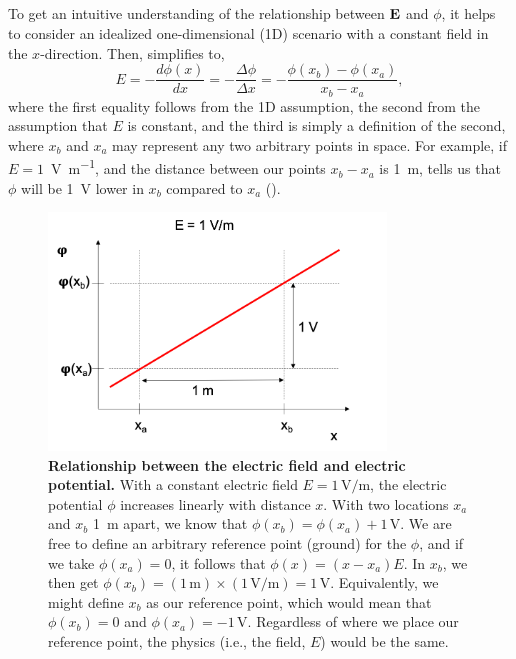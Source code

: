 \subsection{}
\label{sec:Basics:Ground}
To get an intuitive understanding of the relationship between ${\bf E}$ and $\phi$, it helps to consider an idealized one-dimensional (1D) scenario with a constant field in the $x$-direction. Then,  simplifies to,
\begin{equation}
E = -\frac{d\phi(x)}{dx} = -\frac{\Delta \phi}{\Delta x} = -\frac{\phi(x_b)-\phi(x_a)}{x_b-x_a},
\label{eq:Basics:EV1D}
\end{equation}
where the first equality follows from the 1D assumption, the second from the assumption that $E$ is constant, and the third is simply a definition of the second, where $x_b$ and $x_a$ may represent any two arbitrary points in space. For example, if $E = 1$~\si{\volt\per\metre}, and the distance between our points $x_b-x_a$ is 1~\si{\metre},  tells us that $\phi$ will be 1~\si{\volt} lower in $x_b$ compared to $x_a$ ().

\begin{figure}[!ht]
\begin{center}
\includegraphics[width=0.8\textwidth]{Figures/Basics/Ground.png}
\end{center}
\caption{\textbf{Relationship between the electric field and electric potential.} With a constant electric field $E = 1\,\si{\volt\per\metre}$, the electric potential $\phi$ increases linearly with distance $x$. With two locations $x_a$ and $x_b$ 1~\si{\metre} apart, we know that $\phi(x_b) = \phi(x_a) + 1\,\si{\volt}$. We are free to define an arbitrary reference point (ground) for the $\phi$, and if we take $\phi(x_a) = 0$, it follows that $\phi(x) = (x-x_a)E$. In $x_b$, we then get $\phi(x_b)=(1\,\si{\metre})\times(1\, \si{\volt\per\metre}) =1\,\si{\volt}$. Equivalently, we might define $x_b$ as our reference point, which would mean that $\phi(x_b) = 0$ and $\phi(x_a) = -1\,\si{\volt}$. Regardless of where we place our reference point, the physics (i.e., the field, $E$) would be the same.
}
\label{fig:Basics:Ground}
\end{figure}


